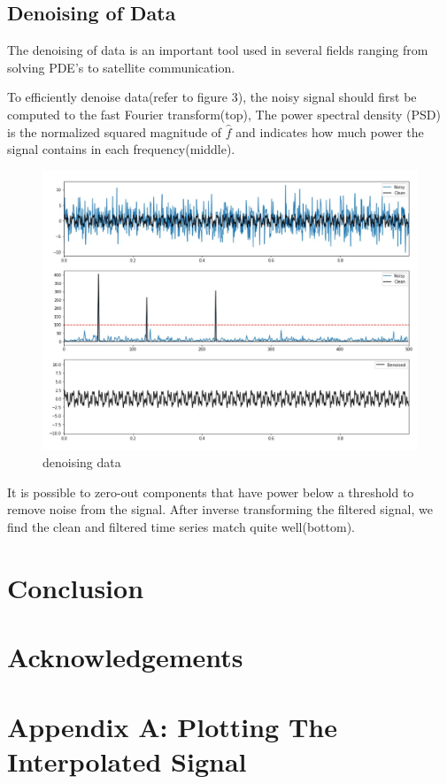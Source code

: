 \documentclass[11pt]{amsart}
\theoremstyle{definition}
\theoremstyle{remark}
\numberwithin{equation}{section}
\begin{document}
 \subsection{Denoising of Data} 
 The denoising of data is an important tool used in several fields ranging from solving PDE's to satellite communication. 

 To efficiently denoise data(refer to figure 3), the noisy signal should first be computed to the fast Fourier transform(top), The power spectral density (PSD) is the normalized squared magnitude of $\hat{f}$ and indicates how much power the signal contains in each frequency(middle). 
\begin{figure}[t]
    \centering
    \includegraphics[width=0.5\linewidth]{../pictures/Screenshot 2024-05-22 133404.png}
    \caption{denoising data}
    \label{fig:3}
\end{figure}

It is possible to zero-out components that have power below a threshold to remove noise from the signal. After inverse transforming the filtered signal, we find the clean and filtered time series match quite well(bottom).

\section{Conclusion}


\section*{Acknowledgements}

\appendix

\section{Appendix A: Plotting The Interpolated Signal}\label{appA}



\cite{Olver2015TopicsIF}
\cite{Strang2019}
\end{document}
